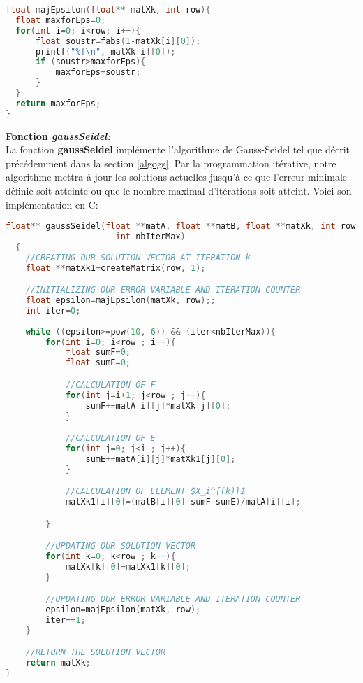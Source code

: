 \begin{lstlisting}[language=C,inputencoding=utf8, basicstyle=\fontsize{8}{10}\selectfont]
float majEpsilon(float** matXk, int row){
  float maxforEps=0;
  for(int i=0; i<row; i++){
      float soustr=fabs(1-matXk[i][0]);
      printf("%f\n", matXk[i][0]);
      if (soustr>maxforEps){
          maxforEps=soustr;
      }
  }
  return maxforEps;
}
\end{lstlisting}
\newpage
\textbf{\underline{Fonction \textit{gaussSeidel:}}}\vspace{6pt}\\
La fonction \textbf{gaussSeidel} implémente l'algorithme de Gauss-Seidel tel que décrit précédemment dans la section \ref{algogs}. Par la programmation itérative, notre algorithme mettra à jour les solutions actuelles jusqu'à ce que l'erreur minimale définie soit atteinte ou que le nombre maximal d'itérations soit atteint. Voici son implémentation en C:

\begin{lstlisting}[mathescape=true, language=C,inputencoding=utf8, basicstyle=\fontsize{8}{10}\selectfont]
  float** gaussSeidel(float **matA, float **matB, float **matXk, int row, int column, 
                      int nbIterMax)
  {
    //CREATING OUR SOLUTION VECTOR AT ITERATION k
    float **matXk1=createMatrix(row, 1);

    //INITIALIZING OUR ERROR VARIABLE AND ITERATION COUNTER
    float epsilon=majEpsilon(matXk, row);;
    int iter=0;
    
    while ((epsilon>=pow(10,-6)) && (iter<nbIterMax)){
        for(int i=0; i<row ; i++){
            float sumF=0;
            float sumE=0;

            //CALCULATION OF F
            for(int j=i+1; j<row ; j++){
                sumF+=matA[i][j]*matXk[j][0];
            }

            //CALCULATION OF E
            for(int j=0; j<i ; j++){
                sumE+=matA[i][j]*matXk1[j][0];
            }

            //CALCULATION OF ELEMENT $X_i^{(k)}$
            matXk1[i][0]=(matB[i][0]-sumF-sumE)/matA[i][i];

        }

        //UPDATING OUR SOLUTION VECTOR
        for(int k=0; k<row ; k++){
            matXk[k][0]=matXk1[k][0];
        }

        //UPDATING OUR ERROR VARIABLE AND ITERATION COUNTER
        epsilon=majEpsilon(matXk, row);
        iter+=1;
    }

    //RETURN THE SOLUTION VECTOR
    return matXk;
}
\end{lstlisting}
\newpage
